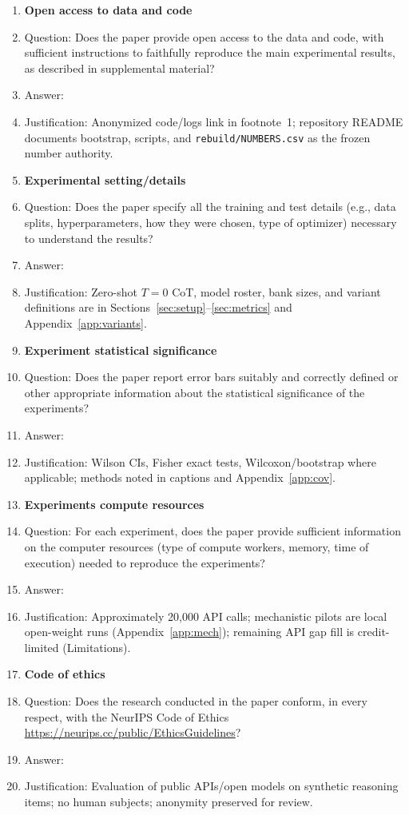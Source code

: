 \begin{enumerate}
\item {\bf Open access to data and code}
    \item[] Question: Does the paper provide open access to the data and code, with sufficient instructions to faithfully reproduce the main experimental results, as described in supplemental material?
    \item[] Answer: \answerYes{}
    \item[] Justification: Anonymized code/logs link in footnote~1; repository README documents bootstrap, scripts, and \texttt{rebuild/NUMBERS.csv} as the frozen number authority.

\item {\bf Experimental setting/details}
    \item[] Question: Does the paper specify all the training and test details (e.g., data splits, hyperparameters, how they were chosen, type of optimizer) necessary to understand the results?
    \item[] Answer: \answerYes{}
    \item[] Justification: Zero-shot $T{=}0$ CoT, model roster, bank sizes, and variant definitions are in Sections~\ref{sec:setup}--\ref{sec:metrics} and Appendix~\ref{app:variants}.

\item {\bf Experiment statistical significance}
    \item[] Question: Does the paper report error bars suitably and correctly defined or other appropriate information about the statistical significance of the experiments?
    \item[] Answer: \answerYes{}
    \item[] Justification: Wilson CIs, Fisher exact tests, Wilcoxon/bootstrap where applicable; methods noted in captions and Appendix~\ref{app:cov}.

\item {\bf Experiments compute resources}
    \item[] Question: For each experiment, does the paper provide sufficient information on the computer resources (type of compute workers, memory, time of execution) needed to reproduce the experiments?
    \item[] Answer: \answerYes{}
    \item[] Justification: Approximately 20{,}000 API calls; mechanistic pilots are local open-weight runs (Appendix~\ref{app:mech}); remaining API gap fill is credit-limited (Limitations).

\item {\bf Code of ethics}
    \item[] Question: Does the research conducted in the paper conform, in every respect, with the NeurIPS Code of Ethics \url{https://neurips.cc/public/EthicsGuidelines}?
    \item[] Answer: \answerYes{}
    \item[] Justification: Evaluation of public APIs/open models on synthetic reasoning items; no human subjects; anonymity preserved for review.


\end{enumerate}
